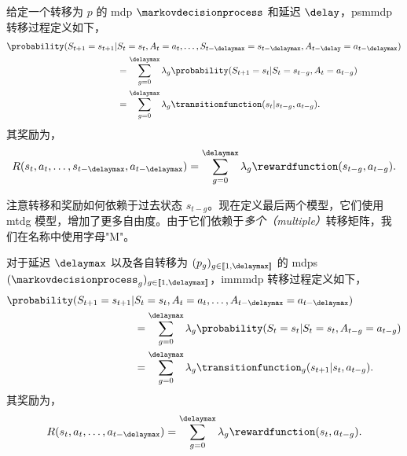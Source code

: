 \begin{defi}
    给定一个转移为 $p$ 的 \gls{mdp} $\markovdecisionprocess$ 和延迟 $\delay$，\gls{psmmdp} 转移过程定义如下，
    \begin{align*}
        \probability(S_{t+1}=s_{t+1}\vert& S_{t}=s_{t},A_{t}=a_{t},\dots,S_{t-\delaymax}=s_{t-\delaymax},A_{t-\delay}=a_{t-\delaymax})
        \\
        &=\sum_{g=0}^\delaymax \lambda_g \probability(S_{t+1}=s_t\vert S_{t}=s_{t-g},A_{t}=a_{t-g})
        \\
        &= \sum_{g=0}^\delaymax \lambda_g \transitionfunction(s_t\vert s_{t-g},a_{t-g}).
    \end{align*}
    其奖励为，
    \begin{align*}
        R(s_{t},a_{t},\dots,s_{t-\delaymax},a_{t-\delaymax}) = \sum_{g=0}^\delaymax \lambda_g \rewardfunction(s_{t-g},a_{t-g}).
    \end{align*}
\end{defi}

注意转移和奖励如何依赖于过去状态 $s_{t-g}$。现在定义最后两个模型，它们使用 \gls{mtdg} 模型，增加了更多自由度。由于它们依赖于\emph{多个（multiple）}转移矩阵，我们在名称中使用字母"M"。

\begin{defi}
    对于延迟 $\delaymax$ 以及各自转移为 $(p_g)_{g\in[\![1,\delaymax]\!]}$ 的 \glspl{mdp} $(\markovdecisionprocess_g)_{g\in[\![1,\delaymax]\!]}$，\gls{immmdp} 转移过程定义如下，
    \begin{align*}
        \probability(S_{t+1}=s_{t+1}\vert& S_{t}=s_{t},A_{t}=a_{t},\dots,A_{t-\delaymax}=a_{t-\delaymax})
        \\
        &=\sum_{g=0}^\delaymax \lambda_g \probability(S_t=s_t\vert S_{t}=s_{t},A_{t-g}=a_{t-g})
        \\
        &= \sum_{g=0}^\delaymax \lambda_g \transitionfunction_g(s_{t+1}\vert s_{t},a_{t-g}).
    \end{align*}
    其奖励为，
    \begin{align*}
        R(s_{t},a_{t},\dots,a_{t-\delaymax}) = \sum_{g=0}^\delaymax \lambda_g \rewardfunction(s_{t},a_{t-g}).
    \end{align*}
\end{defi}

